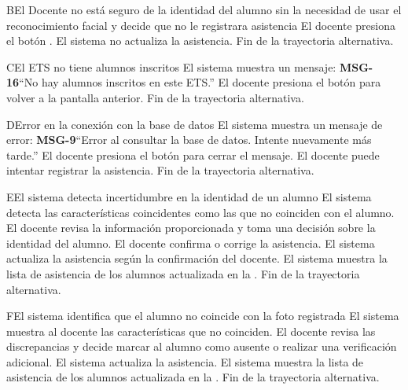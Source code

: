 \begin{UCtrayectoriaA}{B}{El Docente no está seguro de la identidad del alumno sin la necesidad de usar el reconocimiento facial y decide que no le registrara asistencia}
	\UCpaso[\UCactor] El docente presiona el botón .
	\UCpaso El sistema no actualiza la asistencia.
	\UCpaso Fin de la trayectoria alternativa.
\end{UCtrayectoriaA}        
\begin{UCtrayectoriaA}{C}{El ETS no tiene alumnos inscritos}
	\UCpaso El sistema muestra un mensaje: {\bf MSG-16}{``No hay alumnos inscritos en este ETS.''}
	\UCpaso[\UCactor] El docente presiona el botón  para volver a la pantalla anterior.
	\UCpaso Fin de la trayectoria alternativa.
\end{UCtrayectoriaA}
\begin{UCtrayectoriaA}{D}{Error en la conexión con la base de datos}
	\UCpaso El sistema muestra un mensaje de error: {\bf MSG-9}{``Error al consultar la base de datos. Intente nuevamente más tarde.''}
	\UCpaso[\UCactor] El docente presiona el botón  para cerrar el mensaje.
	\UCpaso[\UCactor] El docente puede intentar registrar la asistencia.
	\UCpaso Fin de la trayectoria alternativa.
\end{UCtrayectoriaA}
\begin{UCtrayectoriaA}{E}{El sistema detecta incertidumbre en la identidad de un alumno}
	\UCpaso El sistema detecta las características coincidentes como las que no coinciden con el alumno.
	\UCpaso[\UCactor] El docente revisa la información proporcionada y toma una decisión sobre la identidad del alumno.
	\UCpaso[\UCactor] El docente confirma o corrige la asistencia.
	\UCpaso El sistema actualiza la asistencia según la confirmación del docente.
	\UCpaso El sistema muestra la lista de asistencia de los alumnos actualizada en la .
	\UCpaso Fin de la trayectoria alternativa.
\end{UCtrayectoriaA}
\begin{UCtrayectoriaA}{F}{El sistema identifica que el alumno no coincide con la foto registrada}
	\UCpaso El sistema muestra al docente las características que no coinciden.
	\UCpaso[\UCactor] El docente revisa las discrepancias y decide marcar al alumno como ausente o realizar una verificación adicional.
	\UCpaso El sistema actualiza la asistencia.
	\UCpaso El sistema muestra la lista de asistencia de los alumnos actualizada en la .
	\UCpaso Fin de la trayectoria alternativa.
\end{UCtrayectoriaA}


